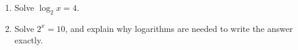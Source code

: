 \begin{enumerate}
\item[(a)] Solve $\log_2 x=4$.
\item[(b)] Solve $2^x=10$, and explain why logarithms are needed to write the answer exactly.
\end{enumerate}
